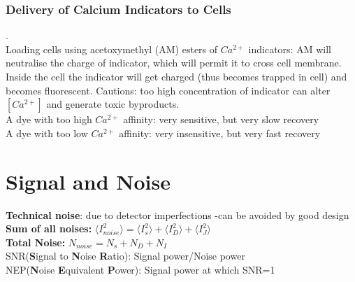 \documentclass[9pt]{article}
\begin{document}
\begin{multicols}{2}
\subsubsection{Delivery of Calcium Indicators to Cells}.\\
Loading cells using acetoxymethyl (AM) esters of $Ca^{2+}$ indicators: AM will neutralise the charge of indicator, which will permit it to cross cell membrane. Inside the cell the indicator will get charged (thus becomes trapped in cell) and becomes fluorescent. Cautions: too high concentration of indicator can alter $[Ca^{2+}]$ and generate toxic byproducts.\\
A dye with too high $Ca^{2+}$ affinity: very sensitive, but very slow recovery\\
A dye with too low $Ca^{2+}$ affinity: very insensitive, but very fast recovery
\section{Signal and Noise}
\textbf{Technical noise}: due to detector imperfections -can be avoided by good design\\
\textbf{Sum of all noises:} $\langle I_{noise}^2 \rangle =\langle I_s^2\rangle + \langle I_D^2 \rangle + \langle I_J^2 \rangle$\\
\textbf{Total Noise:} $N_{noise}  = N_s+N_D+N_I$\\
	SNR(\textbf{S}ignal to \textbf{N}oise \textbf{R}atio): Signal power/Noise power\\
	NEP(\textbf{N}oise \textbf{E}quivalent \textbf{P}ower): Signal power at which SNR=1\\

\end{multicols}
\end{document}
